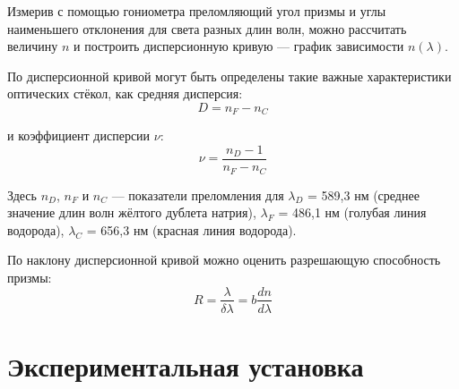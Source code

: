 \documentclass[a4paper,12pt]{article} %
\begin{document}
	Измерив с помощью гониометра преломляющий угол призмы и углы наименьшего отклонения для света разных длин волн, можно рассчитать величину $n$ и построить дисперсионную кривую — график зависимости $n(\lambda)$.
	
	По дисперсионной кривой могут быть определены такие важные характеристики оптических стёкол, как средняя дисперсия:
	\begin{equation*}
		D = n_F - n_C
	\end{equation*}

	и коэффициент дисперсии $\nu$:
	\begin{equation*}
		\nu = \frac{n_D - 1}{n_F - n_C}
	\end{equation*}

	Здесь $n_D$, $n_F$ и $n_C$ — показатели преломления для $\lambda_D$ = 589,3 нм (среднее значение длин волн жёлтого дублета натрия), $\lambda_F$ = 486,1 нм (голубая линия водорода), $\lambda_C$ = 656,3 нм (красная линия водорода).
	
	\newpage
	
	По наклону дисперсионной кривой можно оценить разрешающую способность призмы:
	\begin{equation*}
		R = \frac{\lambda}{\delta \lambda} = b\frac{dn}{d\lambda}
	\end{equation*}
	
	\section*{Экспериментальная установка}
	
\end{document}

